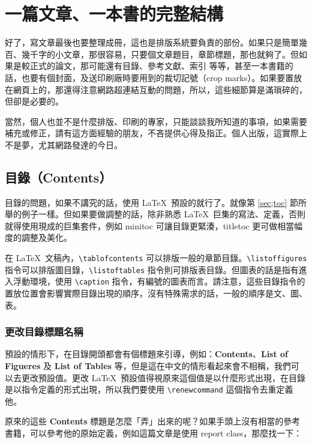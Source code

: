 
\chapter{一篇文章、一本書的完整結構}
\label{ch:abook}

好了，寫文章最後也要整理成冊，這也是排版系統要負責的部份。如果只是簡單幾百、幾千字的小文章，那很容易，只要個文章題目，章節標題，那也就夠了。但如果是較正式的論文，那可能還有目錄、參考文獻、索引 \chdots{}等等，甚至一本書籍的話，也要有個封面，及送印刷廠時要用到的裁切記號（crop marks）。如果要置放在網頁上的，那還得注意網路超連結互動的問題，所以，這些細節算是滿瑣碎的，但卻是必要的。

當然，個人也並不是什麼排版、印刷的專家，只能談談我所知道的事項，如果需要補充或修正，請有這方面經驗的朋友，不吝提供心得及指正。個人出版，這實際上不是夢，尤其網路發達的今日。

\section{目錄（Contents）}

目錄的問題，如果不講究的話，使用 \LaTeX\ 預設的就行了。就像第 \ref{sec;toc} 節所舉的例子一樣。但如果要做調整的話，除非熟悉 \LaTeX\ 巨集的寫法、定義，否則就得使用現成的巨集套件，例如 {\sffamily minitoc} 可讓目錄更緊湊，{\sffamily titletoc} 更可做相當幅度的調整及美化。

在 \LaTeX\ 文稿內，\verb|\tablofcontents| 可以排版一般的章節目錄。\verb|\listoffigures| 指令可以排版圖目錄，\verb|\listoftables| 指令則可排版表目錄。但圖表的話是指有進入浮動環境，使用 \verb|\caption| 指令，有編號的圖表而言。請注意，這些目錄指令的置放位置會影響實際目錄出現的順序，沒有特殊需求的話，一般的順序是文、圖、表。

\subsection{更改目錄標題名稱}

預設的情形下，在目錄開頭都會有個標題來引導，例如：\textbf{Contents}、\textbf{List of Figueres} 及 \textbf{List of Tables} 等，但是這在中文的情形看起來會不相稱，我們可以去更改預設值。更改 \LaTeX\ 預設值得視原來這個值是以什麼形式出現，在目錄是以指令定義的形式出現，所以我們要使用 \verb|\renewcommand| 這個指令去重定義他。

原來的這些 \textbf{Contents} 標題是怎麼「弄」出來的呢？如果手頭上沒有相當的參考書籍，可以參考他的原始定義，例如這篇文章是使用 {\ttfamily report} class，那麼找一下：


